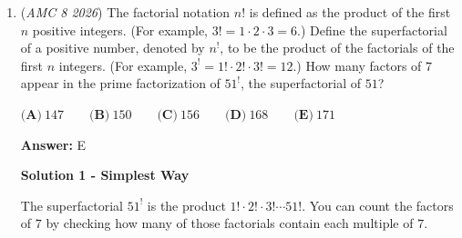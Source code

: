 \begin{enumerate}
\textbf{Solution 7(DO NOT USE)}

For the last 5 problem

 When it comes to the last 5 problems (Questions 21–25) of the AMC 8, the strategy shifts slightly from the overall test.For the final five hardest questions, C is historically the best single letter to guess, closely followed by E.While D dominates the overall test, it drops significantly in frequency during the final stretch. The historical distribution for questions 21–25 follows a different trend:• C: ~23.5\%• E: ~22.0\%• B: ~20.0\%• A: ~18.5\%• D: ~16.0\%

 Why does this happen?

 The last 5 problems are designed to be the most challenging. Test makers know that students running out of time often default to D (due to general test-taking myths) or avoid E (thinking the extreme answer is rarely right). To combat this, they intentionally hide correct answers for the final, hardest questions under C or push them all the way to E. so the correct answer is $\boxed{\textbf{(C)}4\pi+20}.$ BUT, when you guess the entire test use D and check D for everybox which gives you a pretty good score without trying, trust me I know a person who used this stat and got 15!!! then he use C for the last 5

 \textbf{Remark:}

 Clever (even though it is still probabilistic)! You should consider AP Stats!

 


	\item (\textit{AMC 8 2026}) The factorial notation $n!$ is defined as the product of the first $n$ positive integers. (For example, $3! = 1 \cdot 2 \cdot 3 = 6$.) Define the superfactorial of a positive number, denoted by $n^{!}$, to be the product of the factorials of the first $n$ integers. (For example, $3^{!} = 1! \cdot 2! \cdot 3! = 12$.) How many factors of $7$ appear in the prime factorization of $51^{!}$, the superfactorial of $51$?   


 $\textbf{(A)}\ 147 \qquad \textbf{(B)}\ 150 \qquad \textbf{(C)}\ 156 \qquad \textbf{(D)}\ 168 \qquad \textbf{(E)}\ 171$

 \textbf{Answer: }E



\textbf{Solution 1 - Simplest Way}

The superfactorial \(51^{!}\) is the product \(1! \cdot 2! \cdot 3! \cdots 51!\). You can count the factors of \(7\) by checking how many of those factorials contain each multiple of \(7\).


\end{enumerate}
